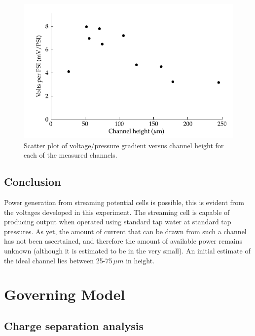 \begin{figure} \begin{centering}
        \includegraphics{content/pt1/01-PowerHarvesting/graphics/streamingCell_slopeVsChannelHeight}
        \par\end{centering}

\protect\caption{\label{fig:streamingCell_scatter_voltGradVsHeight}Scatter plot
    of voltage/pressure gradient versus channel height for each of the measured
    channels.}


\end{figure}



\subsection{Conclusion}

Power generation from streaming potential cells is possible, this is evident
from the voltages developed in this experiment. The streaming cell is capable
of producing output when operated using standard tap water at standard tap
pressures. As yet, the amount of current that can be drawn from such a channel
has not been ascertained, and therefore the amount of available power remains
unknown (although it is estimated to be in the very small). An initial estimate
of the ideal channel lies between 25-75$\,\mu m$ in height.


\section{Governing Model}


\subsection{Charge separation analysis}

